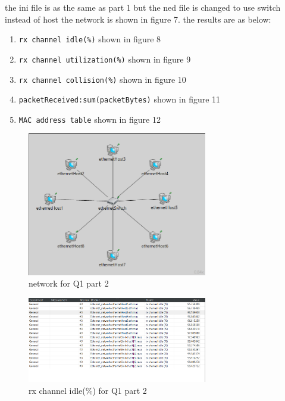 \begin{qsolve}
    \begin{qsolve}[]
        the ini file is as the same as part 1 but the ned file is changed to use switch instead of host the network is shown in figure 7. the results are as below:
        \begin{enumerate}
            \item \texttt{rx channel idle(\%)} shown in figure 8
            \item \texttt{rx channel utilization(\%)} shown in figure 9
            \item \texttt{rx channel collision(\%)} shown in figure 10
            \item \texttt{packetReceived:sum(packetBytes)} shown in figure 11
            \item \texttt{MAC address table} shown in figure 12
        \end{enumerate}
        \begin{figure}[H]
            \centering
            \includegraphics[width=0.7\textwidth]{Q1_2ned.png}
            \caption{network for Q1 part 2}
        \end{figure}
        \begin{figure}[H]
            \centering
            \includegraphics[width=0.7\textwidth]{output5.png}
            \caption{rx channel idle(\%) for Q1 part 2}
        \end{figure}

\end{qsolve}
\end{qsolve}
